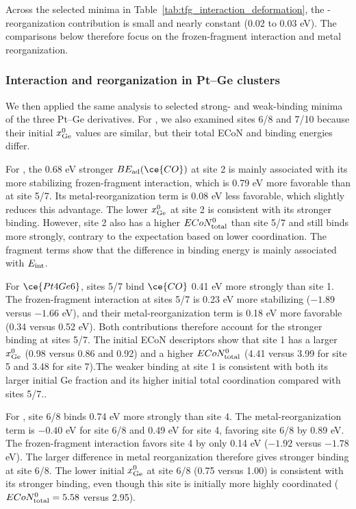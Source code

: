 Across the selected minima in Table~\ref{tab:tfg_interaction_deformation},
the -reorganization contribution is small and nearly constant
(0.02 to 0.03 eV). The comparisons below therefore focus on the
frozen-fragment interaction and metal reorganization.

\subsubsection{Interaction and reorganization in Pt--Ge clusters}

We then applied the same analysis to selected strong- and
weak-binding minima of the three Pt--Ge derivatives. For , we also
examined sites 6/8 and 7/10 because their initial $x_{\rm Ge}^{0}$ values are
similar, but their total ECoN and binding energies differ.

For , the 0.68 eV stronger \(BE_{\rm ad}(\ce{CO})\) at site 2 is mainly associated
with its more stabilizing frozen-fragment interaction, which is 0.79 eV more
favorable than at site 5/7. Its metal-reorganization term is 0.08 eV less
favorable, which slightly reduces this advantage.
The lower \(x_{\rm Ge}^{0}\) at site 2 is consistent
with its stronger binding. However, site 2 also has a higher
\(ECoN_{\rm total}^{0}\) than site 5/7 and still binds  more strongly,
contrary to the expectation based on lower coordination.
The fragment terms show that the difference in binding energy is mainly associated with \(E_{\rm int}\).

For \(\ce{Pt4Ge6}\), sites 5/7 bind \(\ce{CO}\) 0.41 eV more strongly than site 1. The frozen-fragment interaction at sites 5/7 is 0.23 eV more stabilizing (\(-1.89\) versus \(-1.66\) eV), and their metal-reorganization term is 0.18 eV more favorable (0.34 versus 0.52 eV). Both contributions therefore
account for the stronger binding at sites 5/7. The initial ECoN descriptors
show that site 1 has a larger $x_{\rm Ge}^{0}$ (0.98 versus 0.86 and 0.92)
and a higher $ECoN_{\rm total}^{0}$ (4.41 versus 3.99 for site 5 and 3.48
for site 7).The weaker binding at site 1 is consistent with both its
larger initial Ge fraction and its higher initial total coordination compared with sites 5/7..

For , site 6/8 binds  0.74 eV more
strongly than site 4. The metal-reorganization term is $-0.40$ eV for
site 6/8 and 0.49 eV for site 4, favoring site 6/8 by 0.89 eV.
The frozen-fragment interaction favors site 4 by only 0.14 eV
($-1.92$ versus $-1.78$ eV). The larger difference in metal reorganization
therefore gives stronger  binding at site 6/8.
The lower initial $x_{\rm Ge}^{0}$ at site 6/8 (0.75 versus 1.00) is
consistent with its stronger binding, even though this site is initially
more highly coordinated ($ECoN_{\rm total}^{0}=5.58$ versus 2.95).


